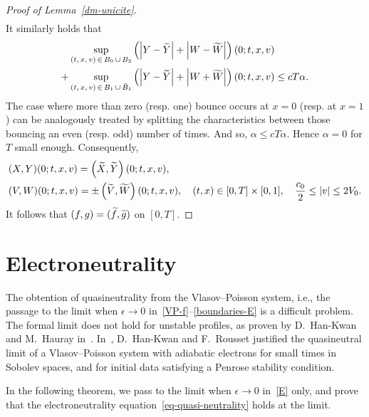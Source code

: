 \documentclass[10pt]{amsart}
\theoremstyle{definition}\newtheorem{defi}[theo]{Definition}\newtheorem{rema}[theo]{Remark}\newtheorem{exam}[theo]{Example}\newtheorem{exem}[theo]{Example}\newtheorem{nota}[theo]{Notation}
\let\oldtilde\tilde
\renewcommand*{\tilde}[1]{\mathchoice{\widetilde{#1}}{\widetilde{#1}}{\oldtilde{#1}}{\oldtilde{#1}}}
\begin{document}
\begin{proof}[{Proof of Lemma~\ref{dm-unicite}}]
\begin{align*}
\end{align*}
It similarly holds that
\begin{align*}
&\sup_{(t,\,x,\,v)\,\in\,B_0\,\cup\,B_2} \left(\left|Y-\tilde{Y}\right|+\left|W-\tilde{W}\right|\right)(0;t,x,v)\\
 + &\sup_{(t,\,x,\,v)\,\in\,B_1\,\cup\,\bar{B}_1} \left(\left|Y-\tilde{Y}\right|+\left|W+\tilde{W}\right|\right)(0;t,x,v) \leq cT\alpha.
\end{align*}
The case where more than zero (resp. one) bounce occurs at $x=0$ (resp. at $x=1$) can be analogously treated by splitting the characteristics between those bouncing an even (resp. odd) number of times. And so, $\alpha \leq cT\alpha $. Hence $\alpha = 0$ for $T$ small enough. Consequently,
\begin{align*}
&(X,Y)(0;t,x,v)= \left(\tilde{X},\tilde{Y}\right)(0;t,x,v),\\
&(V,W)(0;t,x,v)= \pm \left(\tilde{V},\tilde{W}\right)(0;t,x,v),\quad (t,x) \in [0,T] \times [0,1], \quad \frac{c_0}{2} \leq |v| \leq 2V_0.
\end{align*}
It follows that $(f,g)= (\tilde{f},\tilde{g})$ on $[0,T]$.
\end{proof}



\section{Electroneutrality}\label{th-electroneutralite}

The obtention of quasineutrality from the Vlasov--Poisson system, i.e., the passage to the limit when $\epsilon \to 0$ in~\eqref{VP-f}--\eqref{boundaries-E} is a difficult problem. The formal limit does not hold for unstable profiles, as proven by D.~Han-Kwan and M.~Hauray in~\cite{Han15}. In~\cite{Han16}, D.~Han-Kwan and F.~Rousset justified the quasineutral limit of a Vlasov--Poisson system with adiabatic electrons for small times in Sobolev spaces, and for initial data satisfying a Penrose stability condition.


In the following theorem, we pass to the limit when $\epsilon \rightarrow 0$ in~\eqref{E} only, and prove that the electroneutrality equation~\eqref{eq-quasi-neutrality} holds at the limit.
\end{document}
